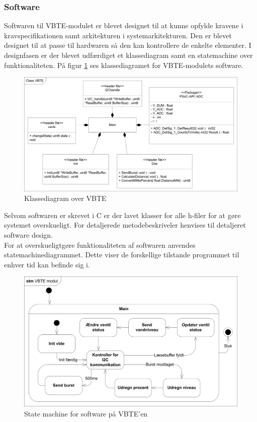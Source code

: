 \subsubsection{Software}
Softwaren til VBTE-modulet er blevet designet til at kunne opfylde kravene i kravspecifikationen samt arkitekturen i systemarkitekturen. Den er blevet designet til at passe til hardwaren så den kan kontrollere de enkelte elementer. I designfasen er der blevet udfærdiget et klassediagram samt en statemachine over funktionaliteten. På figur \ref{fig:VBTEklasse} ses klassediagramet for VBTE-modulets software.
\begin{figure}[H]
\centering
\includegraphics[width=.8\textwidth]{billeder/ClassVBTE}
\caption{Klassediagram over VBTE}
\label{fig:VBTEklasse}
\end{figure}
Selvom softwaren er skrevet i C er der lavet klasser for alle h-filer for at gøre systemet overskueligt. For detaljerede metodebeskriveler henvises til detaljeret software design.\\
For at overskueligtgøre funktionaliteten af softwaren anvendes statemachinediagrammet. Dette viser de forskellige tilstande programmet til enhver tid kan befinde sig i.
\begin{figure}[H]
\centering
\includegraphics[width=.8\textwidth]{billeder/STMVBTE}
\caption{State machine for software på VBTE'en}
\end{figure}

